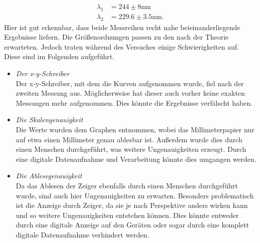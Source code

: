 \begin{align*}
  \lambda_1 & = 244 \pm 8  \si{\nano\meter} \\
  \lambda_2 & = 229.6 \pm 3.5 \si{\nano\meter}.
\end{align*}
\noindent
Hier ist gut erkennbar, dass beide Messreihen recht nahe beieinanderliegende Ergebnisse
liefern. Die Größenordnungen passen zu den nach der Theorie erwarteten.
Jedoch traten während des Versuches einige Schwierigkeiten auf. Diese sind im
Folgenden aufgeführt.
\begin{itemize}
  \item \textit{Der x-y-Schreiber} \\
  Der x-y-Schreiber, mit dem die Kurven aufgenommen wurde, fiel nach der zweiten Messung
  aus. Möglicherweise hat dieser auch vorher keine exakten Messungen mehr aufgenommen.
  Dies könnte die Ergebnisse verfälscht haben.
  \item \textit{Die Skalengenauigkeit} \\
  Die Werte wurden dem Graphen entnommen, wobei das Millimeterpapier nur auf etwa
  einen Millimeter genau ablesbar ist. Außerdem wurde dies durch einen Menschen
  durchgeführt, was weitere Ungenauigkeiten erzeugt. Durch eine digitale Datenaufnahme
  und Verarbeitung könnte dies umgangen werden.
  \item \textit{Die Ablesegenauigkeit} \\
  Da das Ablesen der Zeiger ebenfalls durch einen Menschen durchgeführt wurde,
  sind auch hier Ungenauigkeiten zu erwarten. Besonders problematisch ist die Anzeige
  durch Zeiger, da sie je nach Perspektive anders wirken kann und so weitere
  Ungenauigkeiten entstehen können. Dies könnte entweder durch eine digitale Anzeige
  auf den Geräten oder sogar durch eine komplett digitale Datenaufnahme verhindert
  werden.
\end{itemize}
